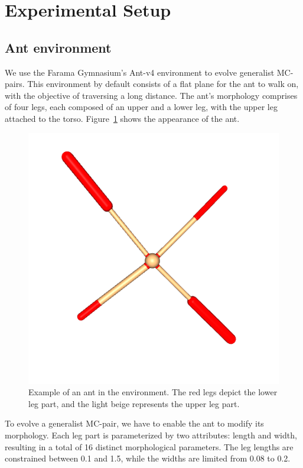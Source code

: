 \section{Experimental Setup}
    \subsection{Ant environment}
        We use the Farama Gymnasium's Ant-v4 environment \cite{Gymnasium2023} to evolve generalist MC-pairs. This environment by default consists of a flat plane for the ant to walk on, with the objective of traversing a long distance. The ant's morphology comprises of four legs, each composed of an upper and a lower leg, with the upper leg attached to the torso. Figure~\ref{fig:ant_env} shows the appearance of the ant. 
        \begin{figure}[ht]
            \centering
            \includegraphics[width=0.9\linewidth]{./resources/ant_307.png}
            \caption{Example of an ant in the environment. The red legs depict the lower leg part, and the light beige represents the upper leg part.}
            \label{fig:ant_env}
        \end{figure}
        To evolve a generalist MC-pair, we have to enable the ant to modify its morphology. Each leg part is parameterized by two attributes: length and width, resulting in a total of 16 distinct morphological parameters. The leg lengths are constrained between 0.1 and 1.5, while the widths are limited from 0.08 to 0.2. 
        
